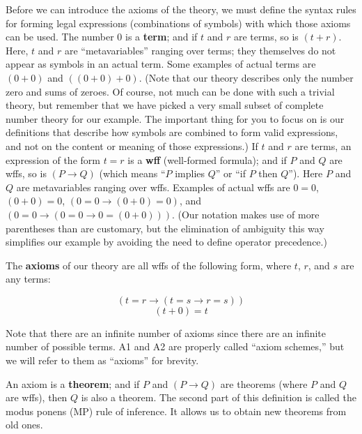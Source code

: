 Before we can introduce the axioms of the theory, we must define
the syntax rules for forming legal expressions
(combinations of symbols) with which those axioms can be used. The number 0 is
a {\bf term}; and if $ t$ and $r$ are terms, so is $(t+r)$. Here,
$ t$ and $r$ are ``metavariables'' ranging over terms; they
themselves do not appear as symbols in an actual term.  Some examples of
actual terms are $(0 + 0)$ and $((0+0)+0)$.  (Note that our theory describes
only the number zero and sums of zeroes.  Of course, not much can be done with
such a trivial theory, but remember that we have picked a very small subset of
complete number theory for our example.  The important thing for you to focus
on is our definitions that describe how symbols are combined to form valid
expressions, and not on the content or meaning of those expressions.) If $ t$
and $r$ are terms, an expression of the form $ t=r$ is a {\bf wff}
(well-formed formula); and if $P$ and $Q$ are
wffs, so is $(P\rightarrow Q)$ (which means ``$P$ implies
$Q$'' or ``if $P$ then $Q$'').
Here $P$ and $Q$ are metavariables ranging over wffs.  Examples of actual
wffs are $0=0$, $(0+0)=0$, $(0=0 \rightarrow (0+0)=0)$, and $(0=0\rightarrow
(0=0\rightarrow 0=(0+0)))$.  (Our notation makes use of more parentheses than
are customary, but the elimination of ambiguity this way simplifies our
example by avoiding the need to define operator precedence.)

The {\bf axioms} of our theory are all wffs of the following
form, where $ t$, $r$, and $s$ are any terms:

\renewcommand{\theequation}{A\arabic{equation}}

\begin{equation}
(t=r\rightarrow (t=s\rightarrow r=s))
\end{equation}
\begin{equation}
(t+0)=t
\end{equation}

Note that there are an infinite number of axioms since there are an infinite
number of possible terms.  A1 and A2 are properly called ``axiom
schemes,'' but we will refer to them as ``axioms'' for
brevity.

An axiom is a {\bf theorem}; and if $P$ and $(P\rightarrow Q)$ are theorems
(where $P$ and $Q$ are wffs), then $Q$ is also a theorem.  The
second part of this definition is called the modus ponens (MP) rule of
inference.  It allows us to obtain
new theorems from old ones.

